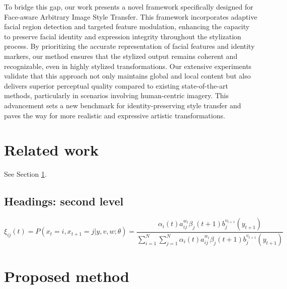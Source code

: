 \documentclass{article}
\begin{document}
To bridge this gap, our work presents a novel framework specifically designed for Face-aware Arbitrary Image Style Transfer. This framework incorporates adaptive facial region detection and targeted feature modulation, enhancing the capacity to preserve facial identity and expression integrity throughout the stylization process. By prioritizing the accurate representation of facial features and identity markers, our method ensures that the stylized output remains coherent and recognizable, even in highly stylized transformations. Our extensive experiments validate that this approach not only maintains global and local content but also delivers superior perceptual quality compared to existing state-of-the-art methods, particularly in scenarios involving human-centric imagery. This advancement sets a new benchmark for identity-preserving style transfer and paves the way for more realistic and expressive artistic transformations.




\section{Related work}
\label{sec:related_work}

\lipsum[4] See Section \ref{sec:related_work}.

\subsection{Headings: second level}
\lipsum[5]
\begin{equation}
	\xi _{ij}(t)=P(x_{t}=i,x_{t+1}=j|y,v,w;\theta)= {\frac {\alpha _{i}(t)a^{w_t}_{ij}\beta _{j}(t+1)b^{v_{t+1}}_{j}(y_{t+1})}{\sum _{i=1}^{N} \sum _{j=1}^{N} \alpha _{i}(t)a^{w_t}_{ij}\beta _{j}(t+1)b^{v_{t+1}}_{j}(y_{t+1})}}
\end{equation}

\section{Proposed method}
\label{sec:proposed_method}
\lipsum[6]

\end{document}
